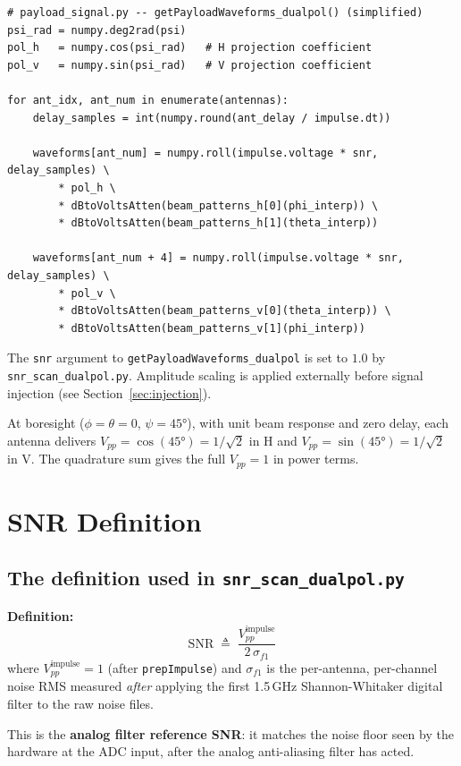 \documentclass[11pt,letterpaper]{article}
\newenvironment{codebox}{%
  \begin{mdframed}[backgroundcolor=codebg,linewidth=0.5pt,innerleftmargin=6pt,innerrightmargin=6pt,innertopmargin=4pt,innerbottommargin=4pt]%
  \small}{\end{mdframed}}
\begin{document}
\begin{codebox}
\begin{Verbatim}
# payload_signal.py -- getPayloadWaveforms_dualpol() (simplified)
psi_rad = numpy.deg2rad(psi)
pol_h   = numpy.cos(psi_rad)   # H projection coefficient
pol_v   = numpy.sin(psi_rad)   # V projection coefficient

for ant_idx, ant_num in enumerate(antennas):
    delay_samples = int(numpy.round(ant_delay / impulse.dt))

    waveforms[ant_num] = numpy.roll(impulse.voltage * snr, delay_samples) \
        * pol_h \
        * dBtoVoltsAtten(beam_patterns_h[0](phi_interp)) \
        * dBtoVoltsAtten(beam_patterns_h[1](theta_interp))

    waveforms[ant_num + 4] = numpy.roll(impulse.voltage * snr, delay_samples) \
        * pol_v \
        * dBtoVoltsAtten(beam_patterns_v[0](theta_interp)) \
        * dBtoVoltsAtten(beam_patterns_v[1](phi_interp))
\end{Verbatim}
\end{codebox}

The \texttt{snr} argument to \texttt{getPayloadWaveforms\_dualpol} is set to
$1.0$ by \texttt{snr\_scan\_dualpol.py}. Amplitude scaling is applied
externally before signal injection (see Section~\ref{sec:injection}).

At boresight ($\phi = \theta = 0$, $\psi = 45°$), with unit beam response and
zero delay, each antenna delivers $V_{pp} = \cos(45°) = 1/\sqrt{2}$ in H and
$V_{pp} = \sin(45°) = 1/\sqrt{2}$ in V. The quadrature sum gives the full
$V_{pp} = 1$ in power terms.

\section{SNR Definition}
\label{sec:snr}

\subsection{The definition used in \texttt{snr\_scan\_dualpol.py}}

\begin{mdframed}[backgroundcolor=notebg,linewidth=1pt]
\textbf{Definition:}
\[
  \mathrm{SNR} \;\triangleq\; \frac{V_{pp}^{\mathrm{impulse}}}{2\,\sigma_{f1}}
\]
where $V_{pp}^{\mathrm{impulse}} = 1$ (after \texttt{prepImpulse}) and
$\sigma_{f1}$ is the per-antenna, per-channel noise RMS measured \emph{after}
applying the first 1.5\,GHz Shannon-Whitaker digital filter to the raw noise
files.

This is the \textbf{analog filter reference SNR}: it matches the noise floor
seen by the hardware at the ADC input, after the analog anti-aliasing filter
has acted.
\end{mdframed}
\end{document}
